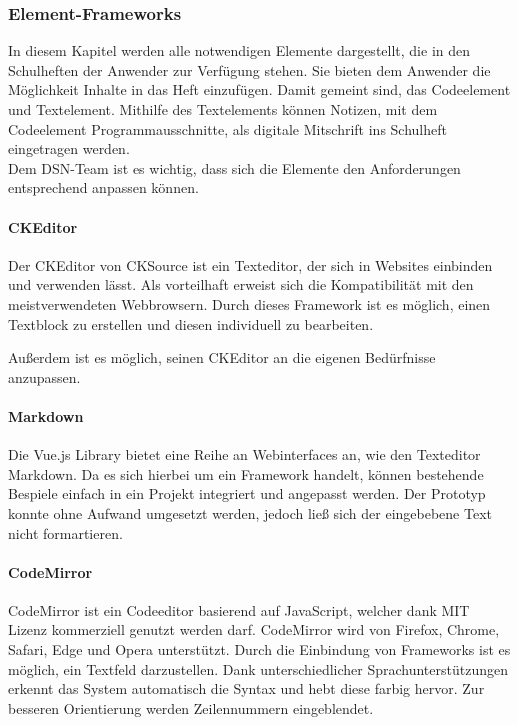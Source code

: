\subsubsection{Element-Frameworks}
In diesem Kapitel werden alle notwendigen Elemente dargestellt, die in den Schulheften der Anwender zur Verfügung stehen. Sie bieten dem Anwender die Möglichkeit Inhalte in das Heft einzufügen. Damit gemeint sind, das Codeelement und Textelement. Mithilfe des Textelements können Notizen, mit dem Codeelement Programmausschnitte, als digitale Mitschrift ins Schulheft eingetragen werden.\\
Dem DSN-Team ist es wichtig, dass sich die Elemente den Anforderungen entsprechend anpassen können.

\paragraph{CKEditor}
Der CKEditor von CKSource ist ein Texteditor, der sich in Websites einbinden und verwenden lässt. Als vorteilhaft erweist sich die Kompatibilität mit den meistverwendeten Webbrowsern. Durch dieses Framework ist es möglich, einen Textblock zu erstellen und diesen individuell zu bearbeiten.

Außerdem ist es möglich, seinen CKEditor an die eigenen Bedürfnisse anzupassen.\cite{CKEDITOR}


\paragraph{Markdown}
Die Vue.js Library bietet eine Reihe an Webinterfaces an, wie den Texteditor Markdown. Da es sich hierbei um ein Framework handelt, können bestehende Bespiele einfach in ein Projekt integriert und angepasst werden. Der Prototyp konnte ohne Aufwand umgesetzt werden, jedoch ließ sich der eingebebene Text nicht formartieren. \cite{MARKDOWN}


\paragraph{CodeMirror}
CodeMirror ist ein Codeeditor basierend auf JavaScript, welcher dank MIT Lizenz kommerziell genutzt werden darf. CodeMirror wird von Firefox, Chrome, Safari, Edge und Opera unterstützt. Durch die Einbindung von Frameworks ist es möglich, ein Textfeld darzustellen. Dank unterschiedlicher Sprachunterstützungen erkennt das System automatisch die Syntax und hebt diese farbig hervor. Zur besseren Orientierung werden Zeilennummern eingeblendet. \cite{CODEMIRROR}

